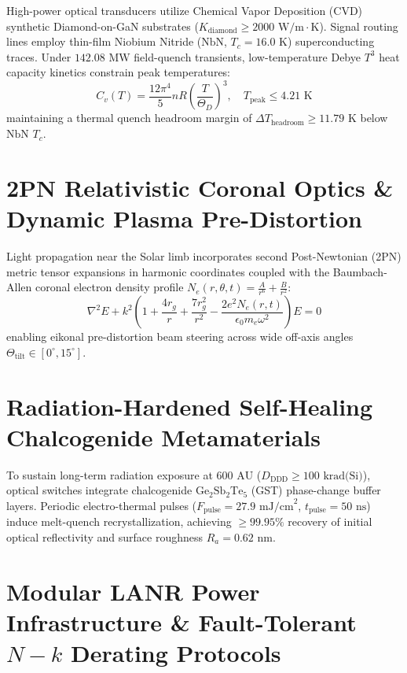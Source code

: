 \documentclass[10pt,twocolumn]{IEEEtran}
\begin{document}
High-power optical transducers utilize Chemical Vapor Deposition (CVD) synthetic Diamond-on-GaN substrates ($K_{\text{diamond}} \ge 2000 \text{ W/m}\cdot\text{K}$). Signal routing lines employ thin-film Niobium Nitride ($\text{NbN}$, $T_c = 16.0 \text{ K}$) superconducting traces. Under $142.08 \text{ MW}$ field-quench transients, low-temperature Debye $T^3$ heat capacity kinetics constrain peak temperatures:
\begin{equation}
    C_v(T) = \frac{12\pi^4}{5} n R \left(\frac{T}{\Theta_D}\right)^3, \quad T_{\text{peak}} \le 4.21 \text{ K}
\end{equation}
maintaining a thermal quench headroom margin of $\Delta T_{\text{headroom}} \ge 11.79 \text{ K}$ below $\text{NbN}$ $T_c$.

\section{2PN Relativistic Coronal Optics \& Dynamic Plasma Pre-Distortion}
\label{sec:coronal_optics}

Light propagation near the Solar limb incorporates second Post-Newtonian (2PN) metric tensor expansions in harmonic coordinates coupled with the Baumbach-Allen coronal electron density profile $N_e(r, \theta, t) = \frac{A}{r^6} + \frac{B}{r^2}$:
\begin{equation}
    \nabla^2 E + k^2 \left( 1 + \frac{4 r_g}{r} + \frac{7 r_g^2}{r^2} - \frac{2 e^2 N_e(r,t)}{\epsilon_0 m_e \omega^2} \right) E = 0
\end{equation}
enabling eikonal pre-distortion beam steering across wide off-axis angles $\Theta_{\text{tilt}} \in [0^\circ, 15^\circ]$.

\section{Radiation-Hardened Self-Healing Chalcogenide Metamaterials}
\label{sec:gst_metamaterial}

To sustain long-term radiation exposure at $600\text{ AU}$ ($D_{\text{DDD}} \ge 100\text{ krad(Si)}$), optical switches integrate chalcogenide $\text{Ge}_2\text{Sb}_2\text{Te}_5$ (GST) phase-change buffer layers. Periodic electro-thermal pulses ($F_{\text{pulse}} = 27.9\text{ mJ/cm}^2$, $t_{\text{pulse}} = 50\text{ ns}$) induce melt-quench recrystallization, achieving $\ge 99.95\%$ recovery of initial optical reflectivity and surface roughness $R_a = 0.62\text{ nm}$.

\section{Modular LANR Power Infrastructure \& Fault-Tolerant $N-k$ Derating Protocols}
\label{sec:lanr_thermal}
\end{document}
